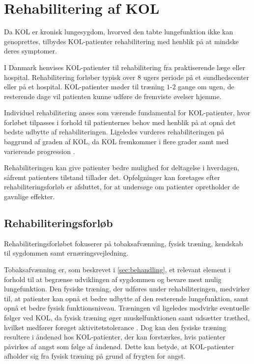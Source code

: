\section{Rehabilitering af KOL}
Da KOL er kronisk lungesygdom, hvorved den tabte lungefunktion ikke kan genoprettes, tilbydes KOL-patienter rehabilitering med henblik på at mindske deres symptomer. 

I Danmark henvises KOL-patienter til rehabilitering fra praktiserende læge eller hospital. Rehabilitering forløber typisk over $8$ ugers periode på et sundhedscenter eller på et hospital. KOL-patienter møder til træning $1$-$2$ gange om ugen, de resterende dage vil patienten kunne udføre de fremviste øvelser hjemme. \cite{McCarthy2015,Frausing2011b} 

Individuel rehabilitering anses som værende fundamental for KOL-patienter, hvor forløbet tilpasses i forhold til patienternes behov med henblik på at opnå det bedste udbytte af rehabiliteringen. \cite{McCarthy2015,Habraken2011,Sundhedsstyrelsen2015} Ligeledes vurderes rehabiliteringen på baggrund af graden af KOL, da KOL fremkommer i flere grader samt med varierende progression \cite{McCarthy2015}. 

Rehabiliteringen kan give patienter bedre mulighed for deltagelse i hverdagen, såfremt patienters tilstand tillader det. \cite{McCarthy2015,Habraken2011, Sundhedsstyrelsen2015} Opfølgninger kan foretages efter rehabiliteringsforløb er afsluttet, for at undersøge om patienter opretholder de gavnlige effekter. \cite{Frausing2011b}


\subsection{Rehabiliteringsforløb}
Rehabiliteringsforløbet fokuserer på tobaksafvænning, fysisk træning, kendskab til sygdommen samt ernæringsvejledning. \cite{McCarthy2015,Habraken2011,Sundhedsstyrelsen2015} 

Tobaksafvænning er, som beskrevet i \autoref{sec:behandling}, et relevant element i forhold til at begrænse udviklingen af sygdommen og bevare mest mulig lungefunktion. Den fysiske træning, der udføres under rehabiliteringen, medvirker til, at patienter kan opnå et bedre udbytte af den resterende lungefunktion, samt opnå et bedre fysisk funktionsniveau. \cite{Sundhedsstyrelsen2015}
Træningen vil ligeledes modvirke eventuelle følger ved KOL, da fysisk træning øger muskelfunktionen samt udsætter træthed, hvilket medfører forøget aktivitetstolerance \cite{McCarthy2015}. Dog kan den fysiske træning resultere i åndenød hos KOL-patienter, der kan forstærkes, hvis patienter påvirkes af angst som følge af åndenød. Dette kan betyde, at KOL-patienter afholder sig fra fysisk træning på grund af frygten for angst. \cite{McCarthy2015, Sundhedsstyrelsen2015} 

